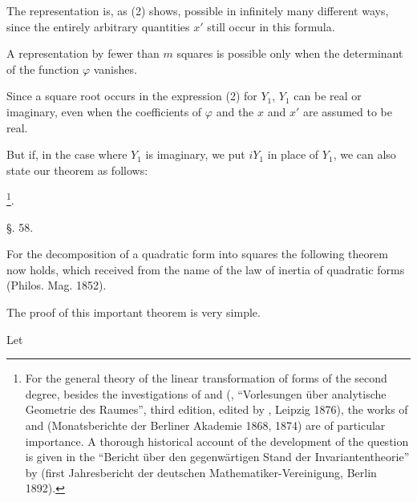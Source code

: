 
The representation is, as (2) shows, possible in infinitely many different ways, since the entirely arbitrary quantities $x'$ still occur in this formula.

A representation by fewer than $m$ squares is possible only when the determinant of the function $\varphi$ vanishes.

Since a square root occurs in the expression (2) for $Y_1$, $Y_1$ can be real or imaginary, even when the coefficients of $\varphi$ and the $x$ and $x'$ are assumed to be real.

But if, in the case where $Y_1$ is imaginary, we put $iY_1$ in place of $Y_1$, we can also state our theorem as follows:

\footnote{For the general theory of the linear transformation of forms of the second degree, besides the investigations of  and  (, ``Vorlesungen über analytische Geometrie des Raumes'', third edition, edited by , Leipzig 1876), the works of  and  (Monatsberichte der Berliner Akademie 1868, 1874) are of particular importance. A thorough historical account of the development of the question is given in the ``Bericht über den gegenwärtigen Stand der Invariantentheorie'' by  (first Jahresbericht der deutschen Mathematiker-Vereinigung, Berlin 1892).}.

\begin{center}
\S. 58.

\end{center}

For the decomposition of a quadratic form into squares the following theorem now holds, which received from  the name of the law of inertia of quadratic forms (Philos. Mag. 1852).


The proof of this important theorem is very simple.

Let
